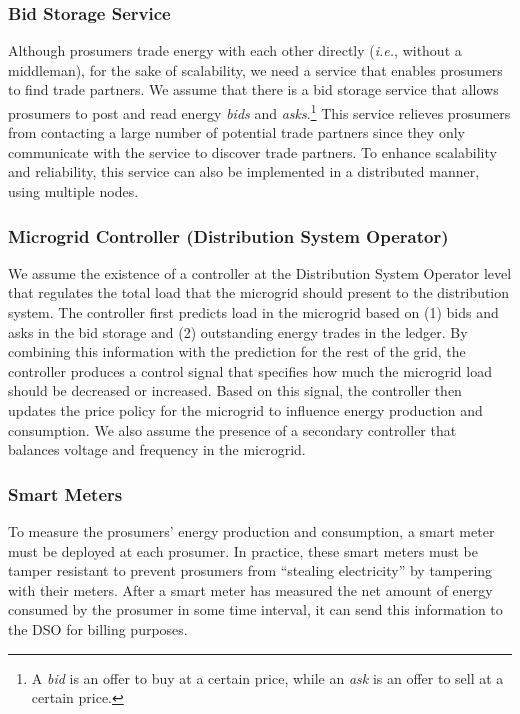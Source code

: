 \subsubsection{Bid Storage Service}
Although prosumers trade energy with each other directly (\emph{i.e.},
without a middleman), for the sake of scalability, we need a service
that enables prosumers to find trade partners.
We assume that there is a bid storage service that allows prosumers to
post and read energy \emph{bids} and \emph{asks}.\footnote{A
  \emph{bid} is an offer to buy at a certain price, while an
  \emph{ask} is an offer to sell at a certain price.}  This service
relieves prosumers from contacting a large number of potential trade
partners since they only communicate with the service to discover
trade partners.
To enhance scalability and reliability, this service can also be
implemented in a distributed manner, using multiple nodes.

\subsubsection{Microgrid Controller (Distribution System Operator)}
We assume the existence of a controller at the Distribution System Operator level that regulates the total load that the microgrid should present to the distribution system.
 The controller first predicts load in the microgrid
based on (1) bids and asks in the bid storage and (2) outstanding
energy trades in the ledger.  By combining this information with the
prediction for the rest of the grid, the controller produces a control
signal that specifies how much the microgrid load should be decreased
or increased.  Based on this signal, the controller then updates the
price policy for the microgrid to influence energy production and
consumption.  We also assume the presence of a secondary controller
that balances voltage and frequency in the microgrid.

\subsubsection{Smart Meters}
To measure the prosumers' energy production and consumption, a smart
meter must be deployed at each prosumer.  In practice, these smart
meters must be tamper resistant to prevent prosumers from ``stealing
electricity'' by tampering with their meters.  After a smart meter has
measured the net amount of energy consumed by the prosumer in some
time interval, it can send this information to the DSO for billing
purposes.

